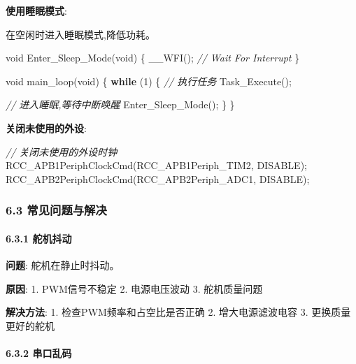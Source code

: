 \documentclass[
]{article}
\newenvironment{Shaded}{}{}
\newcommand{\CommentTok}[1]{\textcolor[rgb]{0.38,0.63,0.69}{\textit{#1}}}
\newcommand{\ControlFlowTok}[1]{\textcolor[rgb]{0.00,0.44,0.13}{\textbf{#1}}}
\newcommand{\DataTypeTok}[1]{\textcolor[rgb]{0.56,0.13,0.00}{#1}}
\newcommand{\DecValTok}[1]{\textcolor[rgb]{0.25,0.63,0.44}{#1}}
\newcommand{\NormalTok}[1]{#1}
\begin{document}
\textbf{使用睡眠模式}:

在空闲时进入睡眠模式,降低功耗。

\begin{Shaded}
\begin{Highlighting}[]
\DataTypeTok{void}\NormalTok{ Enter\_Sleep\_Mode(}\DataTypeTok{void}\NormalTok{)}
\NormalTok{\{}
\NormalTok{    \_\_WFI();  }\CommentTok{// Wait For Interrupt}
\NormalTok{\}}

\DataTypeTok{void}\NormalTok{ main\_loop(}\DataTypeTok{void}\NormalTok{)}
\NormalTok{\{}
    \ControlFlowTok{while}\NormalTok{ (}\DecValTok{1}\NormalTok{) \{}
        \CommentTok{// 执行任务}
\NormalTok{        Task\_Execute();}
        
        \CommentTok{// 进入睡眠,等待中断唤醒}
\NormalTok{        Enter\_Sleep\_Mode();}
\NormalTok{    \}}
\NormalTok{\}}
\end{Highlighting}
\end{Shaded}

\textbf{关闭未使用的外设}:

\begin{Shaded}
\begin{Highlighting}[]
\CommentTok{// 关闭未使用的外设时钟}
\NormalTok{RCC\_APB1PeriphClockCmd(RCC\_APB1Periph\_TIM2, DISABLE);}
\NormalTok{RCC\_APB2PeriphClockCmd(RCC\_APB2Periph\_ADC1, DISABLE);}
\end{Highlighting}
\end{Shaded}

\hypertarget{ux5e38ux89c1ux95eeux9898ux4e0eux89e3ux51b3}{%
\subsubsection{6.3
常见问题与解决}\label{ux5e38ux89c1ux95eeux9898ux4e0eux89e3ux51b3}}

\hypertarget{ux8235ux673aux6296ux52a8}{%
\paragraph{6.3.1 舵机抖动}\label{ux8235ux673aux6296ux52a8}}

\textbf{问题}: 舵机在静止时抖动。

\textbf{原因}: 1. PWM信号不稳定 2. 电源电压波动 3. 舵机质量问题

\textbf{解决方法}: 1. 检查PWM频率和占空比是否正确 2. 增大电源滤波电容 3.
更换质量更好的舵机

\hypertarget{ux4e32ux53e3ux4e71ux7801}{%
\paragraph{6.3.2 串口乱码}\label{ux4e32ux53e3ux4e71ux7801}}
\end{document}
